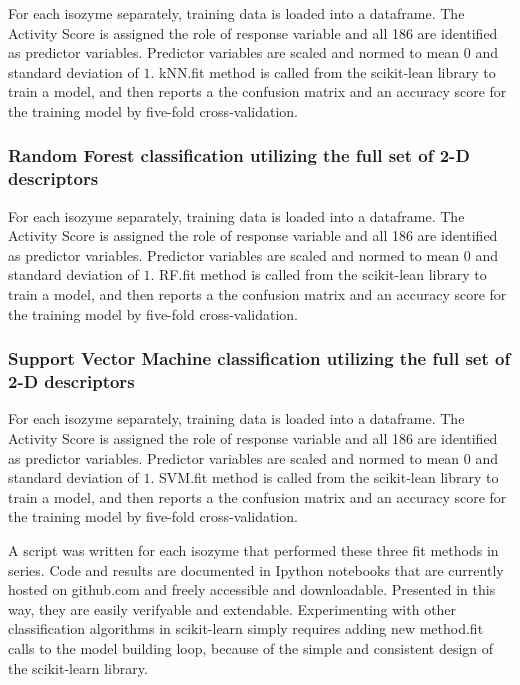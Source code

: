 For each isozyme separately, training data is loaded into a dataframe. The Activity Score is assigned the role of response variable and all 186 are identified as predictor variables. Predictor variables are scaled and normed to mean $0$ and standard deviation of $1$. kNN.fit method is called from the scikit-lean library to train a model, and then reports a the confusion matrix and an accuracy score for the training model by five-fold cross-validation.

\subsubsection{Random Forest classification utilizing the full set of 2-D descriptors}
For each isozyme separately, training data is loaded into a dataframe. The Activity Score is assigned the role of response variable and all 186 are identified as predictor variables. Predictor variables are scaled and normed to mean $0$ and standard deviation of $1$. RF.fit method is called from the scikit-lean library to train a model, and then reports a the confusion matrix and an accuracy score for the training model by five-fold cross-validation.

\subsubsection{Support Vector Machine classification utilizing the full set of 2-D descriptors}
For each isozyme separately, training data is loaded into a dataframe. The Activity Score is assigned the role of response variable and all 186 are identified as predictor variables. Predictor variables are scaled and normed to mean $0$ and standard deviation of $1$. SVM.fit method is called from the scikit-lean library to train a model, and then reports a the confusion matrix and an accuracy score for the training model by five-fold cross-validation.

A script was written for each isozyme that performed these three fit methods in series. Code and results are documented in Ipython notebooks that are currently hosted on github.com and freely accessible and downloadable. Presented in this way, they are easily verifyable and extendable. Experimenting with other classification algorithms in scikit-learn simply requires adding new method.fit calls to the model building loop, because of the simple and consistent design of the scikit-learn library.
